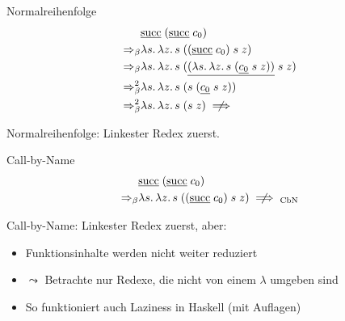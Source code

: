 \documentclass{beamer}
\begin{document}
\begin{frame}{Normalreihenfolge}
        \begin{eqnarray*}
          &
          \app{
            \uline{\csucc}
          }{
            (\app{\uline{\csucc}}{\cn{0}})
          } \\
          \Rightarrow_\beta&
          \lam{s}{\lam{z}{\app{s}{(\app{\app{(\app{\uline{\csucc}}{\cn{0}})}{s}}{z})}}} \\
          \Rightarrow_\beta&
          \lam{s}{\lam{z}{
            \app{s}{
              (\app{\app{\uline{(\lam{s}{\lam{z}{
                \app{s}{(\app{\app{\uline{\cn{0}}}{s}}{z})}
              }})}}{s}}{z})
            }
          }} \\
          \Rightarrow_\beta^2&
          \lam{s}{\lam{z}{
            \app{s}{(\app{s}{(\app{\app{\uline{\cn{0}}}{s}}{z})})}
          }} \\
          \Rightarrow_\beta^2&
          \lam{s}{\lam{z}{
            \app{s}{(\app{s}{z})}
          }} \centernot\implies
        \end{eqnarray*}

        \vfill

        Normalreihenfolge: Linkester Redex zuerst.
\end{frame}

\begin{frame}{Call-by-Name}
        \begin{eqnarray*}
          &
          \app{
            \uline{\csucc}
          }{
            (\app{\uline{\csucc}}{\cn{0}})
          } \\
          \Rightarrow_\beta&
          \lam{s}{\lam{z}{\app{s}{(\app{\app{(\app{\uline{\csucc}}{\cn{0}})}{s}}{z})}}} \centernot\implies_{\text{CbN}}
        \end{eqnarray*}

        \vfill

        Call-by-Name: Linkester Redex zuerst, aber:

        \begin{itemize}
          \item Funktionsinhalte werden nicht weiter reduziert
          \item $\leadsto$ Betrachte nur Redexe, die nicht von einem $\lambda$ umgeben sind
          \item So funktioniert auch Laziness in Haskell (mit Auflagen)
        \end{itemize}
\end{frame}
\end{document}
